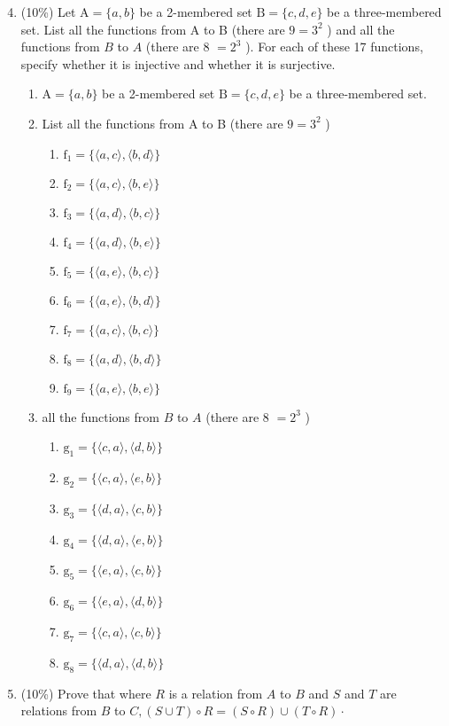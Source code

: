 \documentclass[10pt]{article}
\begin{document}
\begin{enumerate}
  \setcounter{enumi}{3}
  \item (10\%) Let $\mathrm{A}=\{a, b\}$ be a 2-membered set $\mathrm{B}=\{c, d, e\}$ be a three-membered set. List all the functions from A to B (there are $9=3^{2}$ ) and all the functions from $B$ to $A$ (there are 8 $=2^{3}$ ). For each of these 17 functions, specify whether it is injective and whether it is surjective.
  \begin{enumerate}
    \item $\mathrm{A}=\{a, b\}$ be a 2-membered set $\mathrm{B}=\{c, d, e\}$ be a three-membered set.
    \item List all the functions from A to B (there are $9=3^{2}$ )
    \begin{enumerate}
      \item $\mathrm{f}_{1}=\{\langle a, c\rangle, \langle b, d\rangle\}$
      \item $\mathrm{f}_{2}=\{\langle a, c\rangle, \langle b, e\rangle\}$
      \item $\mathrm{f}_{3}=\{\langle a, d\rangle, \langle b, c\rangle\}$
      \item $\mathrm{f}_{4}=\{\langle a, d\rangle, \langle b, e\rangle\}$
      \item $\mathrm{f}_{5}=\{\langle a, e\rangle, \langle b, c\rangle\}$
      \item $\mathrm{f}_{6}=\{\langle a, e\rangle, \langle b, d\rangle\}$
      \item $\mathrm{f}_{7}=\{\langle a, c\rangle, \langle b, c\rangle\}$
      \item $\mathrm{f}_{8}=\{\langle a, d\rangle, \langle b, d\rangle\}$
      \item $\mathrm{f}_{9}=\{\langle a, e\rangle, \langle b, e\rangle\}$
    \end{enumerate}
    \item all the functions from $B$ to $A$ (there are 8 $=2^{3}$ )
    \begin{enumerate}
      \item $\mathrm{g}_{1}=\{\langle c, a\rangle, \langle d, b\rangle\}$
      \item $\mathrm{g}_{2}=\{\langle c, a\rangle, \langle e, b\rangle\}$
      \item $\mathrm{g}_{3}=\{\langle d, a\rangle, \langle c, b\rangle\}$
      \item $\mathrm{g}_{4}=\{\langle d, a\rangle, \langle e, b\rangle\}$
      \item $\mathrm{g}_{5}=\{\langle e, a\rangle, \langle c, b\rangle\}$
      \item $\mathrm{g}_{6}=\{\langle e, a\rangle, \langle d, b\rangle\}$
      \item $\mathrm{g}_{7}=\{\langle c, a\rangle, \langle c, b\rangle\}$
      \item $\mathrm{g}_{8}=\{\langle d, a\rangle, \langle d, b\rangle\}$
    \end{enumerate}
  \end{enumerate}
  \item (10\%) Prove that where $R$ is a relation from $A$ to $B$ and $S$ and $T$ are relations from $B$ to $C,(S \cup T) \circ R=(S \circ R) \cup(T \circ R) \cdot$


\end{enumerate}
\end{document}

